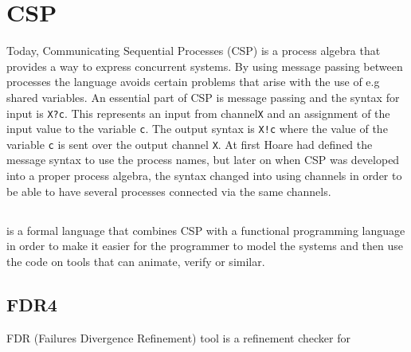 \newpage
\section{CSP}

Today, Communicating Sequential Processes (CSP)  is a process algebra that provides a way to express concurrent systems. By using message passing between processes the language avoids certain problems that arise with the use of e.g shared variables. An essential part of CSP is message passing and the syntax for input is \texttt{X?c}. This represents an input from channel\texttt{X} and an assignment of the input value to the variable \texttt{c}. The output syntax is \texttt{X!c} where the value of the variable \texttt{c} is sent over the output channel \texttt{X}. At first Hoare had defined the message syntax to use the process names, but later on when CSP was developed into a proper process algebra, the syntax changed into using channels in order to be able to have several processes connected via the same channels. %

\subsection{\cspm{}}
\cspm{} is a formal language that combines CSP with a functional programming language in order to make it easier for the programmer to model the systems and then use the code on tools that can animate, verify or similar.


\subsection{FDR4}
FDR (Failures Divergence Refinement) tool is a refinement checker for


